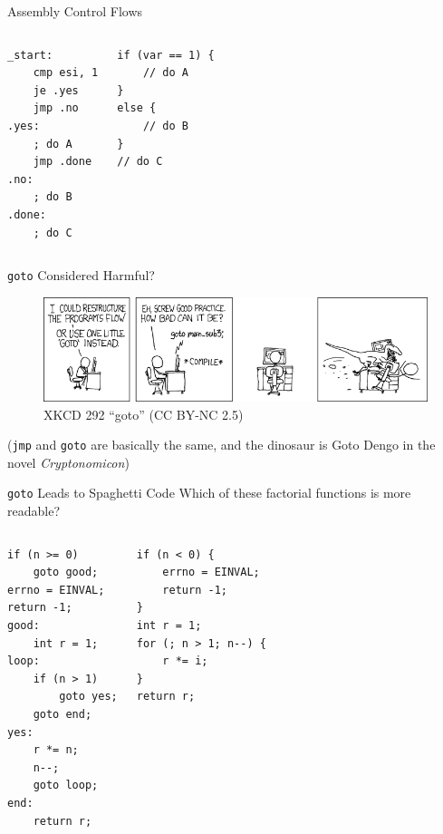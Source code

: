 \documentclass[aspectratio=169]{beamer}
\begin{document}
\begin{frame}[fragile]{Assembly Control Flows}
	\begin{columns}
		\begin{verbatim}
_start:
	cmp esi, 1
	je .yes
	jmp .no
.yes:
	; do A
	jmp .done
.no:
	; do B
.done:
	; do C
		\end{verbatim}
		\begin{verbatim}
if (var == 1) {
	// do A
}
else {
	// do B
}
// do C
		\end{verbatim}
	\end{columns}
\end{frame}

\begin{frame}{\texttt{goto} Considered Harmful?}
	\begin{figure}
		\includegraphics[width=\linewidth]{goto.png}
		\caption{XKCD 292 ``goto'' (CC BY-NC 2.5)}
	\end{figure}
	(\texttt{jmp} and \texttt{goto} are basically the same, and the dinosaur is Goto Dengo in the novel \textit{Cryptonomicon})
\end{frame}

\begin{frame}[fragile]{\texttt{goto} Leads to Spaghetti Code}
	Which of these factorial functions is more readable?
	\begin{columns}
		\column{0.5\textwidth}
		\small
		\begin{verbatim}
if (n >= 0)
	goto good;
errno = EINVAL;
return -1;
good:
	int r = 1;
loop:
	if (n > 1)
		goto yes;
	goto end;
yes: 
	r *= n;
	n--;
	goto loop;
end:
	return r;
		\end{verbatim}
		\column{0.5\textwidth}
		\begin{verbatim}
if (n < 0) {
	errno = EINVAL;
	return -1;
}
int r = 1;
for (; n > 1; n--) {
	r *= i;
}
return r;
		\end{verbatim}
	\end{columns}
\end{frame}
\end{document}
